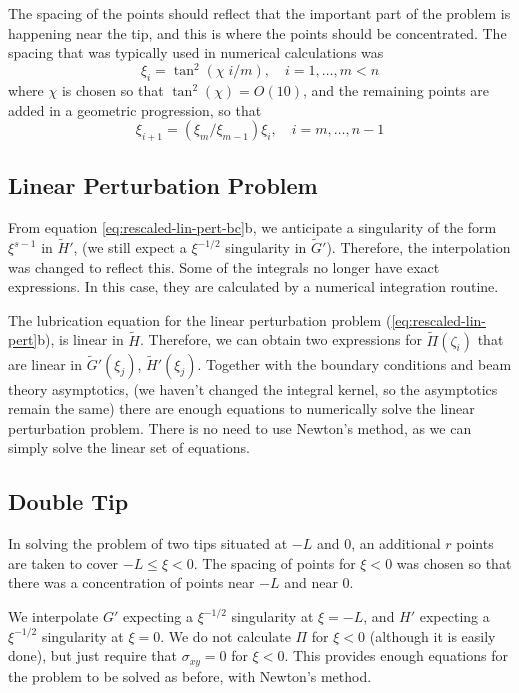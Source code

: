\documentclass{jfm}
\begin{document}
The spacing of the points should reflect that the important 
part of the problem is happening near the tip, and this is where the points
should be concentrated. The spacing that was typically used in numerical 
calculations was 
\begin{equation}
\xi_i = \tan^2( \chi \; i/m ), \quad i=1,\dots,m < n
\end{equation}
where $\chi$ is chosen so that $\tan^2(\chi) = O(10)$, and the remaining points
are added in a geometric progression, so that 
\begin{equation}
\xi_{i+1} = (\xi_m/\xi_{m-1})\xi_{i} , \quad i = m,\dots,n-1
\end{equation}
%
%
\subsection{Linear Perturbation Problem}
%
%
From equation \ref{eq:rescaled-lin-pert-bc}b, we anticipate a 
singularity of the form $\xi^{s-1}$ in $\tilde{H}'$, (we still expect a
$\xi^{-1/2}$ singularity in $\tilde{G}'$). Therefore, the
interpolation was changed to reflect this.
Some of the integrals no longer have exact expressions. In this case, they are
calculated by a numerical integration routine.

The lubrication equation for the linear perturbation problem 
(\ref{eq:rescaled-lin-pert}b), is linear in $\tilde{H}$. Therefore, we can
obtain two expressions for $\tilde{\Pi}(\zeta_i)$ that are linear in 
$\tilde{G}'(\xi_j)$, $\tilde{H}'(\xi_j)$.
Together with the boundary conditions and beam theory asymptotics, 
(we haven't changed the integral kernel, so the asymptotics 
remain the same) there are enough equations to numerically solve the linear 
perturbation problem. There is no need to use 
Newton's method, as we can simply solve the linear set of equations.


\subsection{Double Tip}
In solving the problem of two tips situated at $-L$ and $0$, 
an additional $r$ points are taken to cover $-L \leq \xi < 0$.
The spacing of points for $\xi<0$ was chosen so that there was a concentration
of points near $-L$ and near $0$.

We interpolate $G'$ expecting a $\xi^{-1/2}$ singularity at $\xi = -L$, and
$H'$ expecting a $\xi^{-1/2}$ singularity at $\xi = 0$.
We do not 
calculate $\Pi$ for $\xi <0$ (although it is easily done), but just require that
$\sigma_{xy} = 0$ for $\xi < 0$. This provides enough equations for the problem
to be solved as before, with Newton's method. 
\end{document}
